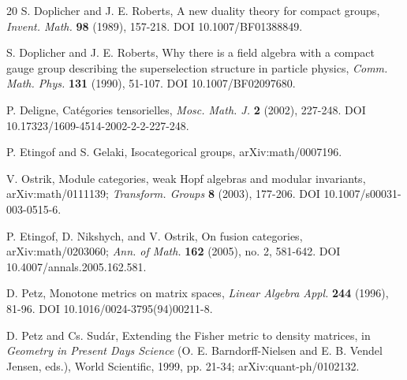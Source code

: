 \documentclass[11pt,letterpaper]{article}
\theoremstyle{definition}
\theoremstyle{remark}
\begin{document}
\begin{thebibliography}{20}
S. Doplicher and J. E. Roberts, A new duality theory for compact groups, \emph{Invent. Math.} \textbf{98} (1989), 157-218. DOI 10.1007/BF01388849.

S. Doplicher and J. E. Roberts, Why there is a field algebra with a compact gauge group describing the superselection structure in particle physics, \emph{Comm. Math. Phys.} \textbf{131} (1990), 51-107. DOI 10.1007/BF02097680.

P. Deligne, Cat\'egories tensorielles, \emph{Mosc. Math. J.} \textbf{2} (2002), 227-248. DOI 10.17323/1609-4514-2002-2-2-227-248.

P. Etingof and S. Gelaki, Isocategorical groups, arXiv:math/0007196.

V. Ostrik, Module categories, weak Hopf algebras and modular invariants, arXiv:math/0111139; \emph{Transform. Groups} \textbf{8} (2003), 177-206. DOI 10.1007/s00031-003-0515-6.

P. Etingof, D. Nikshych, and V. Ostrik, On fusion categories, arXiv:math/0203060; \emph{Ann. of Math.} \textbf{162} (2005), no. 2, 581-642. DOI 10.4007/annals.2005.162.581.

D. Petz, Monotone metrics on matrix spaces, \emph{Linear Algebra Appl.} \textbf{244} (1996), 81-96. DOI 10.1016/0024-3795(94)00211-8.

D. Petz and Cs. Sud\'ar, Extending the Fisher metric to density matrices, in \emph{Geometry in Present Days Science} (O. E. Barndorff-Nielsen and E. B. Vendel Jensen, eds.), World Scientific, 1999, pp. 21-34; arXiv:quant-ph/0102132.

\end{thebibliography}
\end{document}

